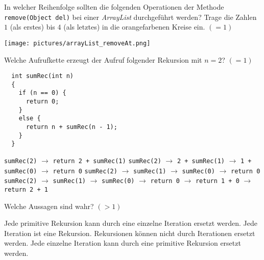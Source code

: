 \documentclass{exam}
\begin{document}
\begin{questions}
  
  \begin{minipage}{\linewidth}
    \question In welcher Reihenfolge sollten die folgenden Operationen der Methode \lstinline[columns=fixed]{remove(Object del)} bei einer \textit{ArrayList} durchgeführt werden? Trage die Zahlen $1$ (als erstes) bis $4$ (als letztes) in die orangefarbenen Kreise ein. $(=1)$ 
    \begin{center}
        \texttt{[image: pictures/arrayList\_removeAt.png]}
    \end{center}
    \vspace{12pt}
  \end{minipage}
  
  \begin{minipage}{\linewidth}
    \question Welche Aufrufkette erzeugt der Aufruf folgender Rekursion mit $n=2$? $(=1)$
    \begin{lstlisting}
  int sumRec(int n)
  {
    if (n == 0) {
      return 0;
    }
    else {
      return n + sumRec(n - 1);
    }
  }
    \end{lstlisting}
    \begin{checkboxes}
      \choice \lstinline[columns=fixed]{sumRec(2)} $\rightarrow$ \lstinline[columns=fixed]{return 2 + sumRec(1)} 
      \choice \lstinline[columns=fixed]{sumRec(2)} $\rightarrow$ \lstinline[columns=fixed]{2 + sumRec(1)} $\rightarrow$ \lstinline[columns=fixed]{1 + sumRec(0)} $\rightarrow$ \lstinline[columns=fixed]{return 0}
      \choice \lstinline[columns=fixed]{sumRec(2)} $\rightarrow$ \lstinline[columns=fixed]{sumRec(1)} $\rightarrow$ \lstinline[columns=fixed]{sumRec(0)} $\rightarrow$ \lstinline[columns=fixed]{return 0}
      \choice \lstinline[columns=fixed]{sumRec(2)} $\rightarrow$ \lstinline[columns=fixed]{sumRec(1)} $\rightarrow$ \lstinline[columns=fixed]{sumRec(0)} $\rightarrow$ \lstinline[columns=fixed]{return 0} $\rightarrow$ \lstinline[columns=fixed]{return 1 + 0} $\rightarrow$ \lstinline[columns=fixed]{return 2 + 1}
    \end{checkboxes}
    \vspace{12pt}
  \end{minipage}

  \begin{minipage}{\linewidth}
    \question Welche Aussagen sind wahr? $(>1)$
    \begin{checkboxes}
      \choice Jede primitive Rekursion kann durch eine einzelne Iteration ersetzt werden.
      \choice Jede Iteration ist eine Rekursion.
      \choice Rekursionen können nicht durch Iterationen ersetzt werden.
      \choice Jede einzelne Iteration kann durch eine primitive Rekursion ersetzt werden.
    \end{checkboxes}
    \vspace{12pt}
  \end{minipage}

\end{questions}
\end{document}
